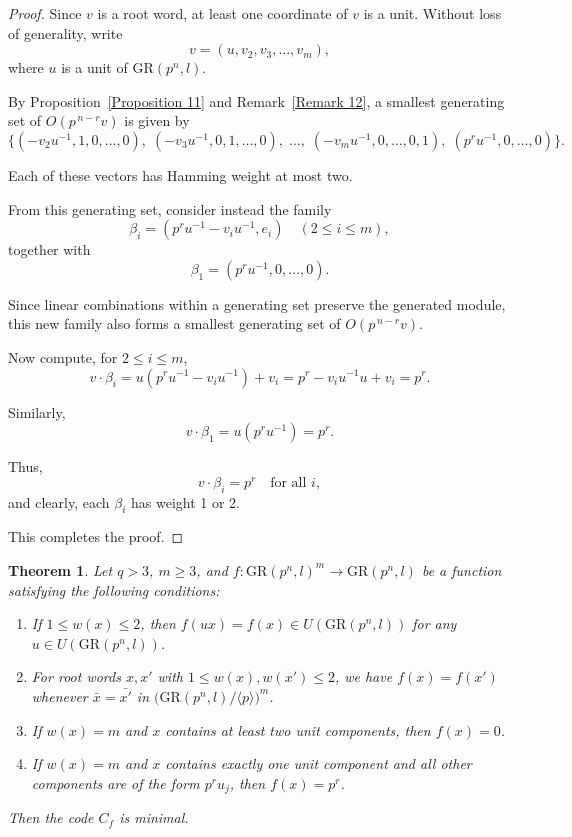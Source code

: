 \documentclass[10pt]{article}
\newtheorem{theorem}[lem]{Theorem}
\theoremstyle{definition}
\begin{document}
\begin{proof}
Since $v$ is a root word, at least one coordinate of $v$ is a unit.
Without loss of generality, write
\[
v=(u,v_2,v_3,\dots,v_m),
\]
where $u$ is a unit of $\mathrm{GR}(p^n,l)$.

By Proposition~\ref{Proposition 11}
and Remark~\ref{Remark 12},
a smallest generating set of $O(p^{\,n-r}v)$ is given by
\[
\Big\{
(-v_2u^{-1},1,0,\dots,0),\;
(-v_3u^{-1},0,1,\dots,0),\;
\dots,\;
(-v_mu^{-1},0,\dots,0,1),\;
(p^ru^{-1},0,\dots,0)
\Big\}.
\]

Each of these vectors has Hamming weight at most two.

From this generating set, consider instead the family
\[
\beta_i=
(p^ru^{-1}-v_iu^{-1},e_i)
\quad (2\le i\le m),
\]
together with
\[
\beta_1=(p^ru^{-1},0,\dots,0).
\]

Since linear combinations within a generating set preserve
the generated module, this new family also forms
a smallest generating set of $O(p^{\,n-r}v)$.

Now compute, for $2\le i\le m$,
\[
v\cdot \beta_i
=
u(p^ru^{-1}-v_iu^{-1})
+
v_i
=
p^r - v_i u^{-1}u + v_i
=
p^r.
\]

Similarly,
\[
v\cdot \beta_1
=
u(p^ru^{-1})
=
p^r.
\]

Thus,
\[
v\cdot \beta_i=p^r
\quad \text{for all } i,
\]
and clearly, each $\beta_i$ has weight 1 or 2.

This completes the proof.
\end{proof}


\begin{theorem}\label{Theorem 43}
Let $q>3$, $m\geq 3$, and
$f:\mathrm{GR}(p^n,l)^m\longrightarrow \mathrm{GR}(p^n,l)$
be a function satisfying the following conditions:

\begin{enumerate}
\item If $1\leq w(x)\leq 2$, then
      $f(ux)=f(x)\in U(\mathrm{GR}(p^n,l))$
      for any $u\in U(\mathrm{GR}(p^n,l))$.

\item For root words $x,x'$ with
      $1\leq w(x),w(x')\leq 2$,
      we have $f(x)=f(x')$ whenever
      $\bar{x}=\bar{x'}$ in
      $\big(\mathrm{GR}(p^n,l)/\langle p\rangle\big)^m$.

\item If $w(x)=m$ and $x$ contains at least two unit components,
      then $f(x)=0$.

\item If $w(x)=m$ and $x$ contains exactly one unit component
      and all other components are of the form $p^ru_j$,
      then $f(x)=p^r$.
\end{enumerate}

Then the code $C_f$ is minimal.
\end{theorem}
\end{document}
